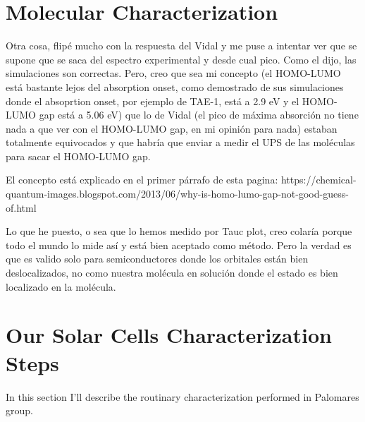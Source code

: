 \section{Molecular Characterization}

Otra cosa, flipé mucho con la respuesta del Vidal y me puse a intentar
ver que se supone que se saca del espectro experimental y desde cual
pico. Como el dijo, las simulaciones son correctas.
Pero, creo que sea mi concepto (el HOMO-LUMO está bastante lejos del
absorption onset, como demostrado de sus simulaciones donde el
absoprtion onset, por ejemplo de TAE-1, está a 2.9 eV y el HOMO-LUMO gap
está a 5.06 eV) que lo de Vidal (el pico de máxima absorción no tiene
nada a que ver con el HOMO-LUMO gap, en mi opinión para nada) estaban
totalmente equivocados y que habría que enviar a medir el UPS de las
moléculas para sacar el HOMO-LUMO gap.

El concepto está explicado en el primer párrafo de esta pagina:
https://chemical-quantum-images.blogspot.com/2013/06/why-is-homo-lumo-gap-not-good-guess-of.html

Lo que he puesto, o sea que lo hemos medido por Tauc plot, creo colaría
porque todo el mundo lo mide así y está bien aceptado como método. Pero
la verdad es que es valido solo para semiconductores donde los orbitales
están bien deslocalizados, no como nuestra molécula en solución donde el
estado es bien localizado en la molécula.

\section{Our Solar Cells Characterization Steps}

In this section I'll describe the routinary characterization performed in Palomares group.


